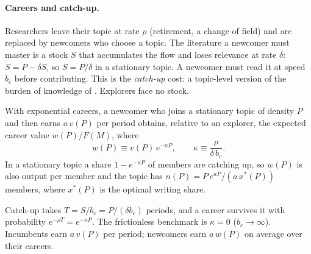 \paragraph{Careers and catch-up.} Researchers leave their topic at rate $\rho$
(retirement, a change of field) and are replaced by newcomers who choose a
topic. The literature a newcomer must master is a stock $S$ that accumulates
the flow and loses relevance at rate $\delta$: $\dot S=P-\delta S$, so
$S=P/\delta$ in a stationary topic. A newcomer must read it at speed $b_c$
before contributing. This is the \emph{catch-up} cost: a topic-level version
of the burden of knowledge of \citet{jones2009}. Explorers face no stock.

\begin{lemma}\label{lem:career}
With exponential careers, a newcomer who joins a stationary topic of density
$P$ and then earns $a\,v(P)$ per period obtains, relative to an explorer, the
expected career value $w(P)/F(M)$, where
\begin{equation}\label{eq:w}
w(P)\equiv v(P)\,e^{-\kappa P},\qquad \kappa\equiv\frac{\rho}{\delta\, b_c}.
\end{equation}
In a stationary topic a share $1-e^{-\kappa P}$ of members are catching up,
so $w(P)$ is also output per member and the topic has
$n(P)=P\,e^{\kappa P}/(a\,x^\ast(P))$ members, where $x^*(P)$ is the optimal
writing share.
\end{lemma}

Catch-up takes $T=S/b_c=P/(\delta b_c)$ periods, and a career survives it with
probability $e^{-\rho T}=e^{-\kappa P}$. The frictionless benchmark is
$\kappa=0$ ($b_c\to\infty$). Incumbents earn $a\,v(P)$ per period;
newcomers earn $a\,w(P)$ on average over their careers.

